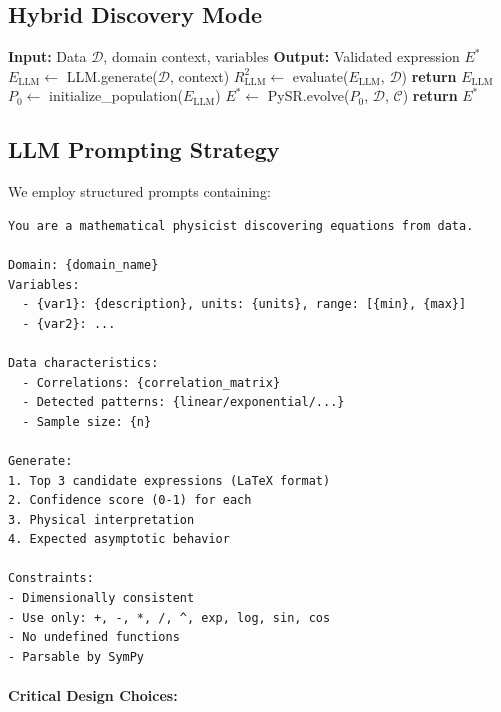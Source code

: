 \documentclass[twoside,11pt]{article}
\begin{document}
\subsection{Hybrid Discovery Mode}

\begin{algorithm}[htbp]
\caption{LLM-Guided Symbolic Discovery}
\label{alg:hybrid}
\begin{algorithmic}[1]
\STATE \textbf{Input:} Data $\mathcal{D}$, domain context, variables
\STATE \textbf{Output:} Validated expression $E^*$
\STATE
\STATE $E_{\text{LLM}} \gets$ LLM.generate($\mathcal{D}$, context)
\STATE $R^2_{\text{LLM}} \gets$ evaluate($E_{\text{LLM}}$, $\mathcal{D}$)
    \STATE \textbf{return} $E_{\text{LLM}}$ 
\ELSE
    \STATE $P_0 \gets$ initialize\_population($E_{\text{LLM}}$)
    \STATE $E^* \gets$ PySR.evolve($P_0$, $\mathcal{D}$, $\mathcal{C}$)
    \STATE \textbf{return} $E^*$ 
\ENDIF
\end{algorithmic}
\end{algorithm}

\subsection{LLM Prompting Strategy}

We employ structured prompts containing:

\begin{small}
\begin{verbatim}
You are a mathematical physicist discovering equations from data.

Domain: {domain_name}
Variables:
  - {var1}: {description}, units: {units}, range: [{min}, {max}]
  - {var2}: ...

Data characteristics:
  - Correlations: {correlation_matrix}
  - Detected patterns: {linear/exponential/...}
  - Sample size: {n}

Generate:
1. Top 3 candidate expressions (LaTeX format)
2. Confidence score (0-1) for each
3. Physical interpretation
4. Expected asymptotic behavior

Constraints:
- Dimensionally consistent
- Use only: +, -, *, /, ^, exp, log, sin, cos
- No undefined functions
- Parsable by SymPy
\end{verbatim}
\end{small}

\paragraph{Critical Design Choices:}
\end{document}
